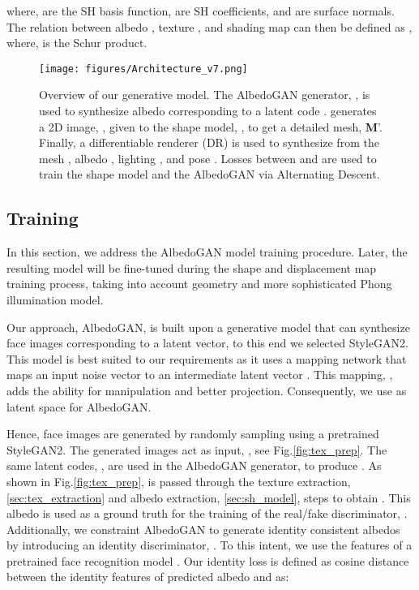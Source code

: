 \documentclass[10pt,twocolumn,letterpaper]{article}
\begin{document}
\vspace{-2mm}

    

where,  are the SH basis function,  are SH coefficients, and  are surface normals. The relation between albedo , texture , and shading map  can then be defined as  
, where,  is the Schur product.





\begin{figure*}[!ht]
\centering
\texttt{[image: figures/Architecture\_v7.png]}
\vspace{1mm}
\caption{Overview of our generative model. The AlbedoGAN generator, , is used to synthesize albedo  corresponding to a latent code .  generates a 2D image, , given to the shape model, , to get a detailed mesh, \textbf{M}'.
Finally, a differentiable renderer (DR) is used to synthesize  from the mesh , albedo , lighting , and pose .
Losses between  and  are used to train the shape model and the AlbedoGAN via Alternating Descent.}
\vspace{-1mm}
\label{fig:architecture}
\vspace{-1mm}
\end{figure*}

\subsection{Training}  
\label{sec:pretraining_albedo}

In this section, we address the AlbedoGAN model training procedure. Later, the resulting model will be fine-tuned during the shape and displacement map training process, taking into account geometry and more sophisticated Phong illumination model.








Our approach, AlbedoGAN, is built upon a generative model that can synthesize face images corresponding to a latent vector, to this end we selected StyleGAN2. 
This model is best suited to our requirements as it uses a mapping network  that maps an input noise vector  to an intermediate latent vector . This mapping, , adds the ability for manipulation and better projection. Consequently, we use  as latent space for AlbedoGAN.

Hence, face images are generated by randomly sampling  using a pretrained StyleGAN2. The generated images act as input, , see Fig.\ref{fig:tex_prep}. The same latent codes, ,  are used in the AlbedoGAN generator, to produce . As shown in Fig.\ref{fig:tex_prep},  is passed through the texture extraction, \ref{sec:tex_extraction} and albedo extraction,  \ref{sec:sh_model}, steps to obtain . This albedo is used as a ground truth for the training of the real/fake discriminator, . Additionally, we constraint AlbedoGAN to generate identity consistent albedos by introducing an identity discriminator, . To this intent, we use the features of a pretrained face recognition model \cite{he2016deep} . Our identity loss is defined as cosine distance between the identity features of predicted albedo  and  as: 
\end{document}
